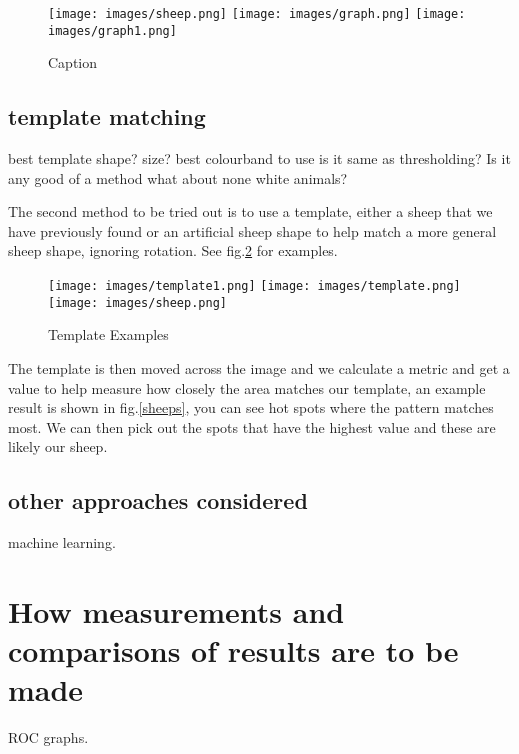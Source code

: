     \begin{figure}
        \centering
        \texttt{[image: images/sheep.png]}
        \texttt{[image: images/graph.png]}
        \texttt{[image: images/graph1.png]}
        \caption{Caption}
        \label{fig:my_label}
    \end{figure}
    
    

\subsection{template matching}

best template shape? size? best colourband to use is it same as thresholding? Is it any good of a method what about none white animals?


The second method to be tried out is to use a template, either a sheep that we have previously found or an artificial sheep shape to help match a more general sheep shape, ignoring rotation. See fig.\ref{templates} for examples.
    
    \begin{figure}
        \caption{Template Examples}
        \texttt{[image: images/template1.png]}
        \texttt{[image: images/template.png]}
        \texttt{[image: images/sheep.png]}
        \label{templates}
    \end{figure}
    
    The template is then moved across the image and we calculate a metric and get a value to help measure how closely the area matches our template, an example result is shown in fig.\ref{sheeps}, you can see hot spots where the pattern matches most. We can then pick out the spots that have the highest value and these are likely our sheep.

\subsection{other approaches considered}

machine learning.

\section{How measurements and comparisons of results are to be made}

ROC graphs.

